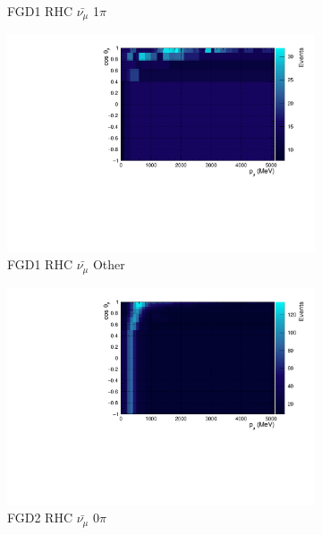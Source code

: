 \begin{figure}
\begin{subfigure}{.32\textwidth}
  \caption{FGD1 RHC $\bar{\nu_{\mu}}$ 1$\pi$}
  \label{fig:th2polyth2polynomFGD1_anti-numuCC_1pi}
\end{subfigure}
\begin{subfigure}{.32\textwidth}
  \centering
  \includegraphics[width=0.95\linewidth]{figs/TH2PolyNom_MC_FGD1_anti-numuCC_other}
  \caption{FGD1 RHC $\bar{\nu_{\mu}}$ Other}
  \label{fig:th2polynomFGD1_anti-numuCC_other}
\end{subfigure}
\centering
\begin{subfigure}{.32\textwidth}
  \centering
  \includegraphics[width=0.95\linewidth]{figs/TH2PolyNom_MC_FGD2_anti-numuCC_0pi}
  \caption{FGD2 RHC $\bar{\nu_{\mu}}$ 0$\pi$}
  \label{fig:th2polynomFGD2_anti-numuCC_0pi}
\end{subfigure}
\begin{subfigure}{.32\textwidth}
  \centering

\end{subfigure}
\end{figure}
